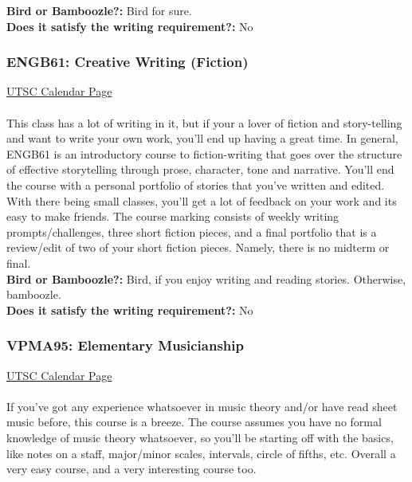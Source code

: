 \documentclass[11pt]{article}
\begin{document}
\textbf{Bird or Bamboozle?:} Bird for sure.\\

\textbf{Does it satisfy the writing requirement?:} No

\subsubsection{ENGB61: Creative Writing (Fiction)}

\href{https://utsc.calendar.utoronto.ca/course/engb61h3}{UTSC Calendar Page}\\\\

This class has a lot of writing in it, but if your a lover of fiction and story-telling and want to write your own work, you'll end up having a great time. In general, ENGB61 is an introductory course to fiction-writing that goes over the structure of effective storytelling   through prose, character, tone and narrative. You'll end the course with a personal portfolio of stories that you've written and edited. With there being small classes, you'll get a lot of feedback on your work and its easy to make friends. The course marking consists of weekly writing prompts/challenges, three short fiction pieces, and a final portfolio that is a review/edit of two of your short fiction pieces. Namely, there is no midterm or final. \\

\textbf{Bird or Bamboozle?:} Bird, if you enjoy writing and reading stories. Otherwise, bamboozle.\\

\textbf{Does it satisfy the writing requirement?:} No

\subsubsection{VPMA95: Elementary Musicianship}

\href{https://utsc.calendar.utoronto.ca/course/VPMA95H3}{UTSC Calendar Page}\\\\

If you've got any experience whatsoever in music theory and/or have read sheet music before, this course is a breeze.  The course assumes you have no formal knowledge of music theory whatsoever, so you'll be starting off with the basics, like notes on a staff, major/minor scales, intervals, circle of fifths, etc.  Overall a very easy course, and a very interesting course too.\\
\end{document}
